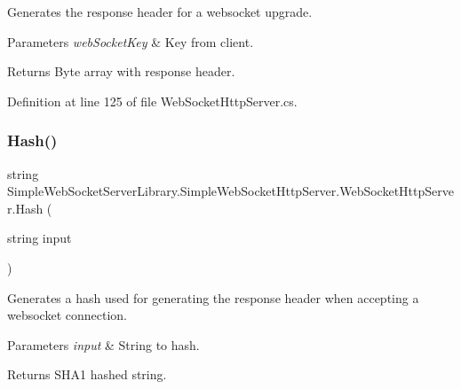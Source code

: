 Generates the response header for a websocket upgrade. 


\begin{DoxyParams}{Parameters}
{\em web\+Socket\+Key} & Key from client.\\
\hline
\end{DoxyParams}
\begin{DoxyReturn}{Returns}
Byte array with response header.
\end{DoxyReturn}


Definition at line 125 of file Web\+Socket\+Http\+Server.\+cs.

\mbox{\label{class_simple_web_socket_server_library_1_1_simple_web_socket_http_server_1_1_web_socket_http_server_a21e28d41ea86e21f91848fc50b6cea66}} 
\subsubsection{\texorpdfstring{Hash()}{Hash()}}
{\footnotesize\ttfamily string Simple\+Web\+Socket\+Server\+Library.\+Simple\+Web\+Socket\+Http\+Server.\+Web\+Socket\+Http\+Server.\+Hash (\begin{DoxyParamCaption}\item[{string}]{input }\end{DoxyParamCaption})\hspace{0.3cm}{\ttfamily [private]}}



Generates a hash used for generating the response header when accepting a websocket connection. 


\begin{DoxyParams}{Parameters}
{\em input} & String to hash.\\
\hline
\end{DoxyParams}
\begin{DoxyReturn}{Returns}
S\+H\+A1 hashed string.
\end{DoxyReturn}



